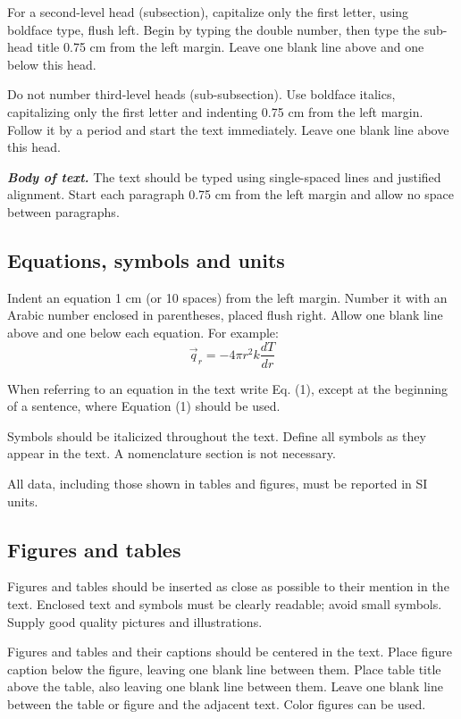 \documentclass[12pt,fleqn]{article}
\begin{document}
For a second-level head (subsection), capitalize only the first letter, using boldface type, flush left. Begin by typing the double number, then type the sub-head title 0.75 cm from the left margin. Leave one blank line above and one below this head. 

Do not number third-level heads (sub-subsection). Use boldface italics, capitalizing only the first letter and indenting 0.75 cm from the left margin. Follow it by a period and start the text immediately. Leave one blank line above this head.

\vspace{0.5cm} %
% 
\textbf{\textit{Body of text.}} The text should be typed using single-spaced lines and justified alignment. Start each paragraph 0.75 cm from the left margin and allow no space between paragraphs.

\subsection{Equations, symbols and units}
Indent an equation 1 cm (or 10 spaces) from the left margin. Number it with an Arabic number enclosed in parentheses, placed flush right. Allow one blank line above and one below each equation. For example:
\begin{equation}
\vec{q}_{r}=-4\pi r^{2}k\frac{dT}{dr}
\label{eq1}
\end{equation}

When referring to an equation in the text write Eq. (1), except at the beginning of a sentence, where Equation (1) should be used. 

Symbols should be italicized throughout the text. Define all symbols as they appear in the text. A nomenclature section is not necessary.

All data, including those shown in tables and figures, must be reported in SI units. 

\subsection{Figures and tables}
Figures and tables should be inserted as close as possible to their mention in the text. Enclosed text and symbols must be clearly readable; avoid small symbols. Supply good quality pictures and illustrations.

Figures and tables and their captions should be centered in the text. Place figure caption below the figure, leaving one blank line between them. Place table title above the table, also leaving one blank line between them. Leave one blank line between the table or figure and the adjacent text. Color figures can be used.
\end{document}
